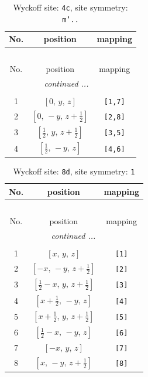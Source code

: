 \documentclass[fleqn,8pt]{jsarticle}
\begin{document}
\renewcommand{\arraystretch}{1.2}
\begin{longtable}{ccc}
\caption{Wyckoff site: {\tt 4c}, site symmetry: {\tt m'..}}
 \\
 \hline \hline
No. & position & mapping \\ \hline \endfirsthead

\multicolumn{2}{l}{\tablename\ \thetable{}} \\
 \hline \hline
No. & position & mapping \\ \hline \endhead

 \hline \hline
\multicolumn{2}{r}{\footnotesize\it continued ...} \\ \endfoot

 \hline \hline
\multicolumn{2}{r}{} \\ \endlastfoot

1 & $\left[ 0,\, y,\, z \right]$ & {\tt [1,7]} \\ \hline
2 & $\left[ 0,\, - y,\, z + \frac{1}{2} \right]$ & {\tt [2,8]} \\ \hline
3 & $\left[ \frac{1}{2},\, y,\, z + \frac{1}{2} \right]$ & {\tt [3,5]} \\ \hline
4 & $\left[ \frac{1}{2},\, - y,\, z \right]$ & {\tt [4,6]} \\
\end{longtable}
\renewcommand{\arraystretch}{1.2}
\begin{longtable}{ccc}
\caption{Wyckoff site: {\tt 8d}, site symmetry: {\tt 1}}
 \\
 \hline \hline
No. & position & mapping \\ \hline \endfirsthead

\multicolumn{2}{l}{\tablename\ \thetable{}} \\
 \hline \hline
No. & position & mapping \\ \hline \endhead

 \hline \hline
\multicolumn{2}{r}{\footnotesize\it continued ...} \\ \endfoot

 \hline \hline
\multicolumn{2}{r}{} \\ \endlastfoot

1 & $\left[ x,\, y,\, z \right]$ & {\tt [1]} \\ \hline
2 & $\left[ - x,\, - y,\, z + \frac{1}{2} \right]$ & {\tt [2]} \\ \hline
3 & $\left[ \frac{1}{2} - x,\, y,\, z + \frac{1}{2} \right]$ & {\tt [3]} \\ \hline
4 & $\left[ x + \frac{1}{2},\, - y,\, z \right]$ & {\tt [4]} \\ \hline
5 & $\left[ x + \frac{1}{2},\, y,\, z + \frac{1}{2} \right]$ & {\tt [5]} \\ \hline
6 & $\left[ \frac{1}{2} - x,\, - y,\, z \right]$ & {\tt [6]} \\ \hline
7 & $\left[ - x,\, y,\, z \right]$ & {\tt [7]} \\ \hline
8 & $\left[ x,\, - y,\, z + \frac{1}{2} \right]$ & {\tt [8]} \\
\end{longtable}
\end{document}
